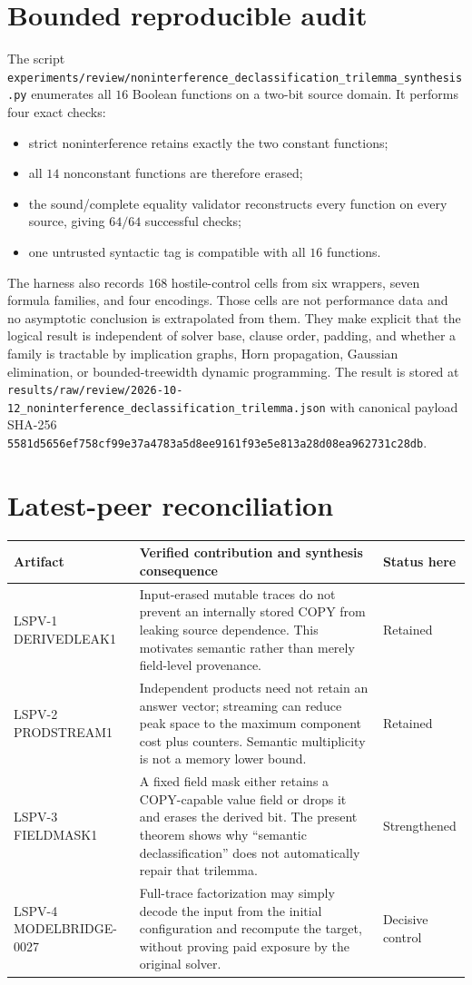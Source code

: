 \documentclass[11pt]{article}
\begin{document}
\section*{Bounded reproducible audit}
The script
\texttt{experiments/review/noninterference\_declassification\_trilemma\_synthesis.py}
enumerates all $16$ Boolean functions on a two-bit source domain.  It performs
four exact checks:
\begin{itemize}
\item strict noninterference retains exactly the two constant functions;
\item all $14$ nonconstant functions are therefore erased;
\item the sound/complete equality validator reconstructs every function on
every source, giving $64/64$ successful checks;
\item one untrusted syntactic tag is compatible with all $16$ functions.
\end{itemize}
The harness also records $168$ hostile-control cells from six wrappers, seven
formula families, and four encodings.  Those cells are not performance data
and no asymptotic conclusion is extrapolated from them.  They make explicit
that the logical result is independent of solver base, clause order, padding,
and whether a family is tractable by implication graphs, Horn propagation,
Gaussian elimination, or bounded-treewidth dynamic programming.  The result
is stored at
\texttt{results/raw/review/2026-10-12\_noninterference\_declassification\_trilemma.json}
with canonical payload SHA-256
\texttt{5581d5656ef758cf99e37a4783a5d8ee9161f93e5e813a28d08ea962731c28db}.

\section*{Latest-peer reconciliation}
\begin{center}
\begin{tabularx}{\textwidth}{p{}Xp{}}
\toprule
Artifact & Verified contribution and synthesis consequence & Status here\\
\midrule
LSPV-1 DERIVEDLEAK1 & Input-erased mutable traces do not prevent an internally
stored COPY from leaking source dependence.  This motivates semantic rather
than merely field-level provenance. & Retained\\
LSPV-2 PRODSTREAM1 & Independent products need not retain an answer vector;
streaming can reduce peak space to the maximum component cost plus counters.
Semantic multiplicity is not a memory lower bound. & Retained\\
LSPV-3 FIELDMASK1 & A fixed field mask either retains a COPY-capable value
field or drops it and erases the derived bit.  The present theorem shows why
``semantic declassification'' does not automatically repair that trilemma. &
Strengthened\\
LSPV-4 MODELBRIDGE-0027 & Full-trace factorization may simply decode the input
from the initial configuration and recompute the target, without proving paid
exposure by the original solver. & Decisive control\\
\bottomrule
\end{tabularx}
\end{center}
\end{document}
